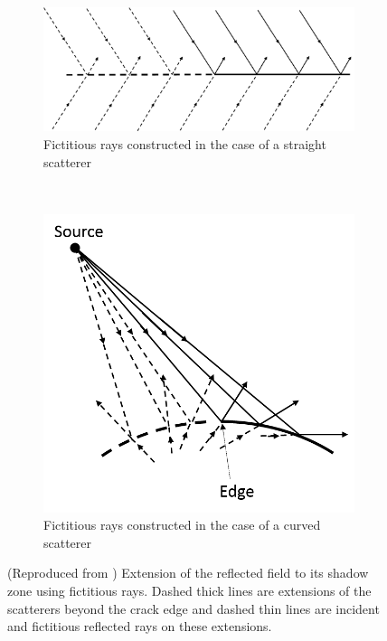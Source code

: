 \begin{figure}[h]
    \centering
    \begin{subfigure}[b]{0.45\textwidth}
        \includegraphics[width=\textwidth]{images/chapter1/FictitiousStraight.png}
        \caption{Fictitious rays constructed in the case of a straight scatterer}
        \label{Straightfict}
    \end{subfigure}
    ~ 
    \begin{subfigure}[b]{0.45\textwidth}
        \includegraphics[width=\textwidth]{images/chapter1/FictitiousCurved.png}
        \caption{Fictitious rays constructed in the case of a curved scatterer}
        \label{Curvedfict}
    \end{subfigure}
    \caption{(Reproduced from \cite{Bouche,Molinet}) Extension of the reflected field to its shadow zone using fictitious rays. Dashed thick lines are extensions of the scatterers beyond the crack edge and dashed thin lines are incident and fictitious reflected rays on these extensions.}
    \label{FictRays}
\end{figure}

